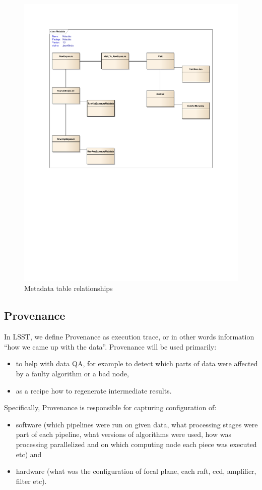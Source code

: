 \documentclass[DM,lsstdraft,toc]{lsstdoc}
\begin{document}
\begin{figure}
  \centering\includegraphics[scale=0.8]{diagrams/metadata}
  \caption{Metadata table relationships}
\end{figure}

\subsection{Provenance}

In LSST, we define Provenance as execution trace, or in other words information ``how we came up with the data''. Provenance will be used primarily:
%
\begin{itemize}
  \item to help with data QA, for example to detect which parts of data were affected by a faulty algorithm or a bad node,
  \item as a recipe how to regenerate intermediate results.
\end{itemize}

Specifically, Provenance is responsible for capturing configuration of:
%
\begin{itemize}
  \item software (which pipelines were run on given data, what processing stages were part of each pipeline, what versions of algorithms were used, how was processing parallelized and on which computing node each piece was executed etc) and
  \item hardware (what was the configuration of focal plane, each raft, ccd, amplifier, filter etc).
\end{itemize}
\end{document}
